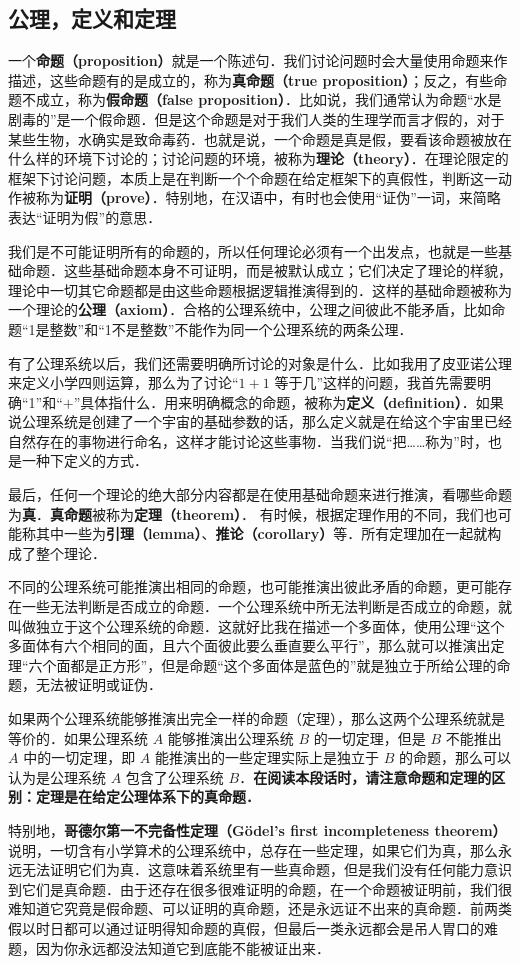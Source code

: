 
\subsection{公理，定义和定理}
一个\textbf{命题（proposition）}就是一个陈述句．我们讨论问题时会大量使用命题来作描述，这些命题有的是成立的，称为\textbf{真命题（true proposition）}；反之，有些命题不成立，称为\textbf{假命题（false proposition）}．比如说，我们通常认为命题“水是剧毒的”是一个假命题．但是这个命题是对于我们人类的生理学而言才假的，对于某些生物，水确实是致命毒药．也就是说，一个命题是真是假，要看该命题被放在什么样的环境下讨论的；讨论问题的环境，被称为\textbf{理论（theory）}．在理论限定的框架下讨论问题，本质上是在判断一个个命题在给定框架下的真假性，判断这一动作被称为\textbf{证明（prove）}．特别地，在汉语中，有时也会使用“证伪”一词，来简略表达“证明为假”的意思．

我们是不可能证明所有的命题的，所以任何理论必须有一个出发点，也就是一些基础命题．这些基础命题本身不可证明，而是被默认成立；它们决定了理论的样貌，理论中一切其它命题都是由这些命题根据逻辑推演得到的．这样的基础命题被称为一个理论的\textbf{公理（axiom）}．合格的公理系统中，公理之间彼此不能矛盾，比如命题“1是整数”和“1不是整数”不能作为同一个公理系统的两条公理．

有了公理系统以后，我们还需要明确所讨论的对象是什么．比如我用了皮亚诺公理来定义小学四则运算，那么为了讨论“$1+1$ 等于几”这样的问题，我首先需要明确“1”和“$+$”具体指什么．用来明确概念的命题，被称为\textbf{定义（definition）}．如果说公理系统是创建了一个宇宙的基础参数的话，那么定义就是在给这个宇宙里已经自然存在的事物进行命名，这样才能讨论这些事物．当我们说“把……称为”时，也是一种下定义的方式．

最后，任何一个理论的绝大部分内容都是在使用基础命题来进行推演，看哪些命题为\textbf{真}．\textbf{真命题}被称为\textbf{定理（theorem）}． 有时候，根据定理作用的不同，我们也可能称其中一些为\textbf{引理（lemma）}、\textbf{推论（corollary）}等．所有定理加在一起就构成了整个理论．

不同的公理系统可能推演出相同的命题，也可能推演出彼此矛盾的命题，更可能存在一些无法判断是否成立的命题．一个公理系统中所无法判断是否成立的命题，就叫做独立于这个公理系统的命题．这就好比我在描述一个多面体，使用公理“这个多面体有六个相同的面，且六个面彼此要么垂直要么平行”，那么就可以推演出定理“六个面都是正方形”，但是命题“这个多面体是蓝色的”就是独立于所给公理的命题，无法被证明或证伪．

如果两个公理系统能够推演出完全一样的命题（定理），那么这两个公理系统就是等价的．如果公理系统 $A$ 能够推演出公理系统 $B$ 的一切定理，但是 $B$ 不能推出 $A$ 中的一切定理，即 $A$ 能推演出的一些定理实际上是独立于 $B$ 的命题，那么可以认为是公理系统 $A$ 包含了公理系统 $B$．\textbf{在阅读本段话时，请注意命题和定理的区别：定理是在给定公理体系下的真命题．}

特别地，\textbf{哥德尔第一不完备性定理（Gödel's first incompleteness theorem）}说明，一切含有小学算术的公理系统中，总存在一些定理，如果它们为真，那么永远无法证明它们为真．这意味着系统里有一些真命题，但是我们没有任何能力意识到它们是真命题．由于还存在很多很难证明的命题，在一个命题被证明前，我们很难知道它究竟是假命题、可以证明的真命题，还是永远证不出来的真命题．前两类假以时日都可以通过证明得知命题的真假，但最后一类永远都会是吊人胃口的难题，因为你永远都没法知道它到底能不能被证出来．
